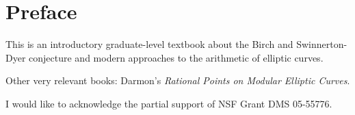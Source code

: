 %

\chapter*{Preface}


This is an introductory graduate-level textbook about the Birch and
Swinnerton-Dyer conjecture and modern approaches to the arithmetic 
of elliptic curves. 

Other very relevant books: Darmon's {\em Rational Points
on Modular Elliptic Curves}.


\vspace{2ex}
I would like to acknowledge the partial support of 
NSF Grant DMS 05-55776.


\vspace{2ex}

